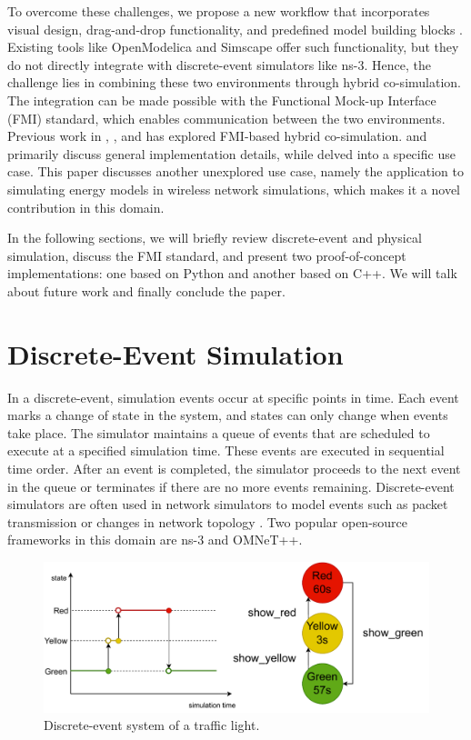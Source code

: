 \documentclass[conference]{IEEEtran}
\def\ns3{ns-3}
\begin{document}
To overcome these challenges, we propose a new workflow that incorporates visual design, drag-and-drop functionality, and predefined model building blocks \cite{carreira2020foundations}. Existing tools like OpenModelica and Simscape offer such functionality, but they do not directly integrate with discrete-event simulators like \ns3. Hence, the challenge lies in combining these two environments through hybrid co-simulation.
The integration can be made possible with the Functional Mock-up Interface (FMI) standard, which enables communication between the two environments.
Previous work in \cite{cremona2019hybrid}, \cite{cremona2016step}, and \cite{widl2015fmi} has explored FMI-based hybrid co-simulation. \cite{cremona2019hybrid} and \cite{cremona2016step} primarily discuss general implementation details, while \cite{widl2015fmi} delved into a specific use case.
This paper discusses another unexplored use case, namely the application to simulating energy models in wireless network simulations, which makes it a novel contribution in this domain.

In the following sections, we will briefly review discrete-event and physical simulation, discuss the FMI standard, and present two proof-of-concept implementations: one based on Python and another based on C++. We will talk about future work and finally conclude the paper.

\section{Discrete-Event Simulation}

In a discrete-event, simulation events occur at specific points in time.
Each event marks a change of state in the system, and states can only change when events take place. 
The simulator maintains a queue of events that are scheduled to execute at a specified simulation time.
These events are executed in sequential time order.
After an event is completed, the simulator proceeds to the next event in the queue or terminates if there are no more events remaining.
Discrete-event simulators are often used in network simulators to model events such as
packet transmission or changes in network topology \cite{riley2010ns}.
Two popular open-source frameworks in this domain are \ns3 and OMNeT++.

\begin{figure}[htbp]
  \centering
  \includegraphics[width=\linewidth]{images/traffic-light.drawio.pdf}
  \caption{Discrete-event system of a traffic light.}
  \label{traffic-light}
\end{figure}
\end{document}
